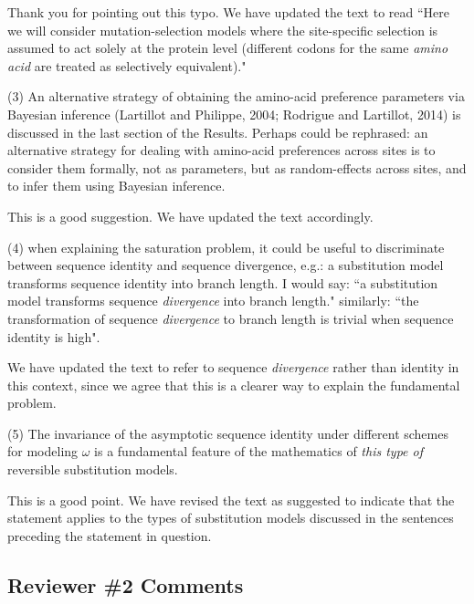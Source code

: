 \documentclass[11pt, oneside]{article}   	%
\newcommand{\response}[1]{{\color{black}#1}}
\begin{document}
\response{Thank you for pointing out this typo. 
We have updated the text to read ``Here we will consider mutation-selection models where the site-specific selection is assumed to act solely at the protein level (different codons for the same \emph{amino acid} are treated as selectively equivalent)."}

(3) An alternative strategy of obtaining the amino-acid preference parameters via Bayesian inference (Lartillot and Philippe, 2004; Rodrigue and Lartillot, 2014) is discussed in the last section of the Results. 
Perhaps could be rephrased: an alternative strategy for dealing with amino-acid preferences across sites is to consider them formally, not as parameters, but as random-effects across sites, and to infer them using Bayesian inference.

\response{This is a good suggestion. We have updated the text accordingly.}

(4) when explaining the saturation problem, it could be useful to discriminate between sequence identity and sequence divergence, e.g.: 
a substitution model transforms sequence identity into branch length. I would say: ``a substitution model transforms sequence \emph{divergence} into branch length." 
similarly: 
``the transformation of sequence \emph{divergence} to branch length is trivial when sequence identity is high". 

\response{We have updated the text to refer to sequence \emph{divergence} rather than identity in this context, since we agree that this is a clearer way to explain the fundamental problem.}

(5) The invariance of the asymptotic sequence identity under different schemes for modeling $\omega$ is a fundamental feature of the mathematics of \emph{this type of} reversible substitution models. 

\response{This is a good point. 
We have revised the text as suggested to indicate that the statement applies to the types of substitution models discussed in the sentences preceding the statement in question.}

\subsection*{Reviewer \#2 Comments} 
\end{document}
